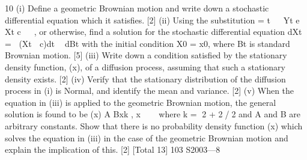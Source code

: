 \documentclass[a4paper,12pt]{article}
\begin{document}
\begin{enumerate}
10 (i) Define a geometric Brownian motion and write down a stochastic differential
equation which it satisfies. [2]
(ii) Using the substitution = t  
Yt e Xt c 
 , or otherwise, find a solution for the
stochastic differential equation
dXt = (Xt  c)dt  dBt
with the initial condition X0 = x0, where Bt is standard Brownian motion. [5]
(iii) Write down a condition satisfied by the stationary density function, 
(x), of a
diffusion process, assuming that such a stationary density exists. [2]
(iv) Verify that the stationary distribution of the diffusion process in (i) is Normal,
and identify the mean and variance. [2]
(v) When the equation in (iii) is applied to the geometric Brownian motion, the
general solution is found to be
(x) A Bxk ,
x   
where k = 2 + 2/2 and A and B are arbitrary constants. Show that there is
no probability density function 
(x) which solves the equation in (iii) in the
case of the geometric Brownian motion and explain the implication of this. [2]
[Total 13]
103 S2003—8



\end{enumerate}
\end{document}
